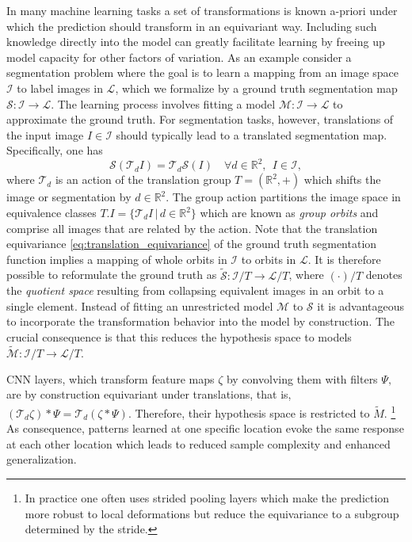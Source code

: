 \documentclass[10pt,twocolumn,letterpaper]{article}
\begin{document}
In many machine learning tasks a set of transformations is known a-priori under which the prediction should transform in an equivariant way.
Including such knowledge directly into the model can greatly facilitate learning by freeing up model capacity for other factors of variation.
As an example consider a segmentation problem where the goal is to learn a mapping from an image space $\mathcal{I}$ to label images in $\mathcal{L}$, which we formalize by a ground truth segmentation map $\mathcal{S}:\mathcal{I}\to\mathcal{L}.$
The learning process involves fitting a model $\mathcal{M}:\mathcal{I}\to\mathcal{L}$ to approximate the ground truth.
For segmentation tasks, however, translations of the input image $I\in\mathcal{I}$ should typically lead to a translated segmentation map.
Specifically, one has
\begin{equation}\label{eq:translation_equivariance}
	\mathcal{S}\left(\mathcal{T}_d I\right) = \mathcal{T}_d\mathcal{S}(I) \quad \forall d\in \mathbb{R}^2,\ \ I\in \mathcal{I},
\end{equation}
where $\mathcal{T}_d$ is an action of the translation group $T=(\mathbb{R}^2,+)$ which shifts the image or segmentation by $d\in\mathbb{R}^2.$
The group action partitions the image space in equivalence classes $T.I=\{\mathcal{T}_d I \,|\, d\in\mathbb{R}^2\}$ which are known as \emph{group orbits} and comprise all images that are related by the action.
Note that the translation equivariance \eqref{eq:translation_equivariance} of the ground truth segmentation function implies a mapping of whole orbits in $\mathcal{I}$ to orbits in $\mathcal{L}.$
It is therefore possible to reformulate the ground truth as $\widetilde{\mathcal{S}}:\mathcal{I}/T\to\mathcal{L}/T$,
where $(\cdot)/T$ denotes the \emph{quotient space} resulting from collapsing equivalent images in an orbit to a single element.
Instead of fitting an unrestricted model $\mathcal{M}$ to $\mathcal{S}$ it is advantageous to incorporate the transformation behavior into the model by construction.
The crucial consequence is that this reduces the hypothesis space to models $\widetilde{\mathcal{M}}:\mathcal{I}/T\to\mathcal{L}/T.$

CNN layers, which transform feature maps $\zeta$ by convolving them with filters $\Psi,$ are by construction equivariant under translations, that is, $\left(\mathcal{T}_d \zeta\right) \ast \Psi = \mathcal{T}_d\left(\zeta \ast \Psi\right).$
Therefore, their hypothesis space is restricted to $\widetilde{M}.$
\footnote{In practice one often uses strided pooling layers which make the prediction more robust to local deformations but reduce the equivariance to a subgroup determined by the stride.}
As consequence, patterns learned at one specific location evoke the same response at each other location which leads to reduced sample complexity and enhanced generalization.
\end{document}
